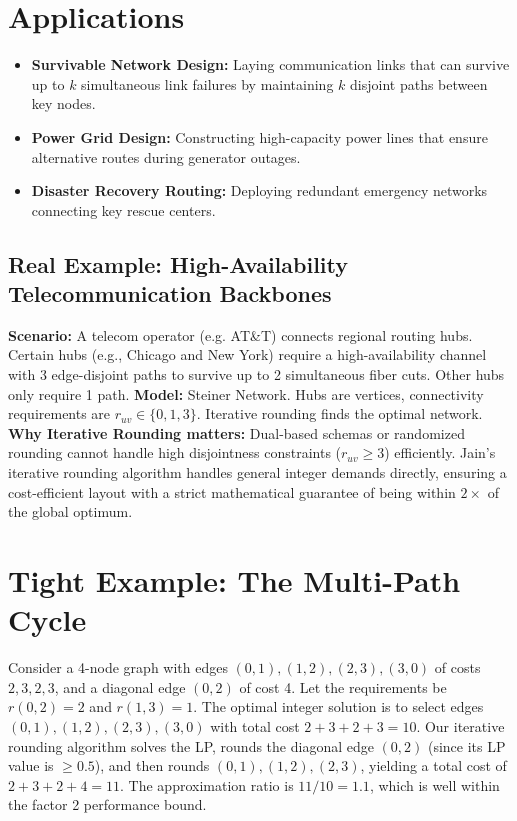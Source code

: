 \section{Applications}
\begin{itemize}
    \item \textbf{Survivable Network Design:} Laying communication links that can survive up to $k$ simultaneous link failures by maintaining $k$ disjoint paths between key nodes.
    \item \textbf{Power Grid Design:} Constructing high-capacity power lines that ensure alternative routes during generator outages.
    \item \textbf{Disaster Recovery Routing:} Deploying redundant emergency networks connecting key rescue centers.
\end{itemize}

\subsection*{Real Example: High-Availability Telecommunication Backbones}
\textbf{Scenario:} A telecom operator (e.g. AT\&T) connects regional routing hubs. Certain hubs (e.g., Chicago and New York) require a high-availability channel with 3 edge-disjoint paths to survive up to 2 simultaneous fiber cuts. Other hubs only require 1 path.
\textbf{Model:} Steiner Network. Hubs are vertices, connectivity requirements are $r_{uv} \in \{0, 1, 3\}$. Iterative rounding finds the optimal network.
\textbf{Why Iterative Rounding matters:} Dual-based schemas or randomized rounding cannot handle high disjointness constraints ($r_{uv} \ge 3$) efficiently. Jain's iterative rounding algorithm handles general integer demands directly, ensuring a cost-efficient layout with a strict mathematical guarantee of being within $2 \times$ of the global optimum.

\section{Tight Example: The Multi-Path Cycle}
Consider a 4-node graph with edges $(0, 1), (1, 2), (2, 3), (3, 0)$ of costs $2, 3, 2, 3$, and a diagonal edge $(0, 2)$ of cost 4. Let the requirements be $r(0, 2) = 2$ and $r(1, 3) = 1$.
The optimal integer solution is to select edges $(0, 1), (1, 2), (2, 3), (3, 0)$ with total cost $2 + 3 + 2 + 3 = 10$.
Our iterative rounding algorithm solves the LP, rounds the diagonal edge $(0, 2)$ (since its LP value is $\ge 0.5$), and then rounds $(0, 1), (1, 2), (2, 3)$, yielding a total cost of $2 + 3 + 2 + 4 = 11$.
The approximation ratio is $11/10 = 1.1$, which is well within the factor 2 performance bound.

